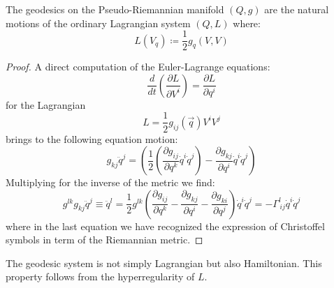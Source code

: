 \documentclass[Main]{subfiles}
\begin{document}
	\begin{proposition}
		The geodesics on the Pseudo-Riemannian manifold $(Q,g)$ are the natural motions of the ordinary Lagrangian system $(Q, L)$ where:
		\begin{equation}
			L(V_q) \coloneqq \frac{1}{2} g_q(V,V)
		\end{equation}
	\end{proposition}	
	\begin{proof}
		A direct computation of the Euler-Lagrange equations:
		\begin{displaymath}
			\frac{d}{dt} \left( \frac{\partial L}{\partial V^i}\right) = \frac{\partial L}{\partial q^i}
		\end{displaymath}
		for the Lagrangian
		\begin{displaymath}
			L = \frac{1}{2} g_{i j} ( \vec{q} ) V^i V^j
		\end{displaymath}
		brings to the following equation motion:
		\begin{displaymath}
			g_{k j} \ddot{q}^j = \left(
				 \frac{1}{2} \left(
				 	\frac{\partial g_{i j}}{\partial q^k} \dot{q}^i \dot{q}^j \right)
				  - \frac{\partial g_{k j}}{\partial q^i} \dot{q}^i \dot{q}^j  \right)
		\end{displaymath}
		Multiplying for the inverse of the metric we find:
		\begin{displaymath}
			g^{l k} g_{k j } \ddot{q}^j \equiv \ddot{q}^l = \frac{1}{2} g^{l k} \left( \frac{\partial g_{i j}}{\partial q^k} - \frac{\partial g_{k j}}{\partial q^i}- \frac{\partial g_{k i}}{\partial q^j}\right) \dot{q}^i \dot{q}^j 
			= - \Gamma^l_{\, i j} \dot{q}^i \dot{q}^j
		\end{displaymath}
		where in the last equation we have recognized the expression of Christoffel symbols in term of the Riemannian metric.
	\end{proof}

	\begin{remark}
		The geodesic system is not simply Lagrangian but also Hamiltonian.
		This property follows from the hyperregularity\cite{Abraham1978} of $L$.
	\end{remark}
\end{document}
